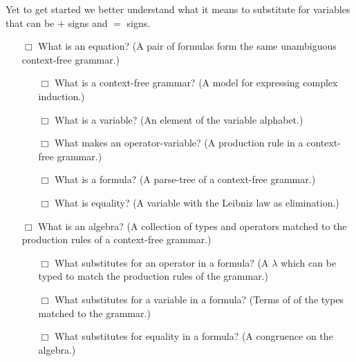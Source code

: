 Yet to get started we better understand what it means to substitute 
for variables that can be $+$ signs and $=$ signs.
\begin{itemize}
    \item[$\Box$] What is an equation? (A pair of formulas form the same unambiguous context-free grammar.)
    \begin{itemize}
        \item[$\Box$] What is a context-free grammar? (A model for expressing complex induction.)

        \item[$\Box$] What is a variable? (An element of the variable alphabet.)

        \item[$\Box$] What makes an operator-variable? (A production rule in a context-free grammar.)

        \item[$\Box$] What is a formula? (A parse-tree of a context-free grammar.)
        
        \item[$\Box$] What is equality? (A variable with the Leibniz law as elimination.)

    \end{itemize}

    \item[$\Box$] What is an algebra? (A collection of types and operators matched to the 
    production rules of a context-free grammar.)
    \begin{itemize}
        \item[$\Box$] What substitutes for an operator in a formula? 
        (A $\lambda$ which can be typed to match the production rules of the grammar.)

        \item[$\Box$] What substitutes for a variable in a formula?
        (Terms of of the types matched to the grammar.)
        
        \item[$\Box$] What substitutes for equality in a formula? 
        (A congruence on the algebra.)
    \end{itemize} 
    
\end{itemize}
